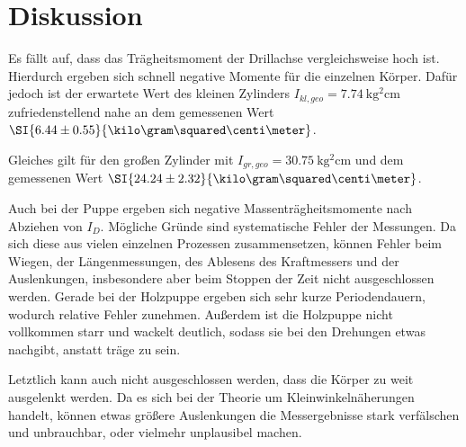 \section{Diskussion}
\label{sec:Diskussion}

Es fällt auf, dass das Trägheitsmoment der Drillachse vergleichsweise hoch ist.
Hierdurch ergeben sich schnell negative Momente für die einzelnen Körper.
Dafür jedoch ist der erwartete Wert des kleinen Zylinders $I_{kl,geo} = \SI{7.74}{\kilo\gram\squared\centi\meter}$
zufriedenstellend nahe an dem gemessenen Wert $\SI{6.44\pm0.55}{\kilo\gram\squared\centi\meter}$.

Gleiches gilt für den großen Zylinder mit $I_{gr,geo} = \SI{30.75}{\kilo\gram\squared\centi\meter}$ und dem
gemessenen Wert $\SI{24.24\pm2.32}{\kilo\gram\squared\centi\meter}$.

Auch bei der Puppe ergeben sich negative Massenträgheitsmomente nach Abziehen von $I_D$.
Mögliche Gründe sind systematische Fehler der Messungen. Da sich diese aus vielen einzelnen Prozessen zusammensetzen,
können Fehler beim Wiegen, der Längenmessungen, des Ablesens des Kraftmessers und der Auslenkungen, insbesondere aber beim Stoppen
der Zeit nicht ausgeschlossen werden. Gerade bei der Holzpuppe ergeben sich sehr kurze Periodendauern, wodurch relative Fehler zunehmen.
Außerdem ist die Holzpuppe nicht vollkommen starr und wackelt deutlich, sodass sie bei den Drehungen etwas nachgibt, anstatt träge zu sein.

Letztlich kann auch nicht ausgeschlossen werden, dass die Körper zu weit ausgelenkt werden. Da es sich bei der Theorie
um Kleinwinkelnäherungen handelt, können etwas größere Auslenkungen die Messergebnisse stark verfälschen und unbrauchbar, oder vielmehr unplausibel machen.